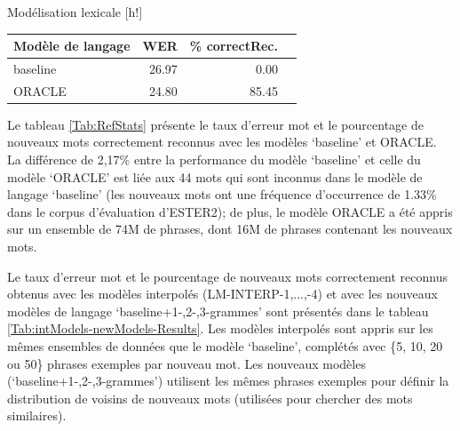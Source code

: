 \documentclass{style/these}
\makeatletter
\renewcommand\familydefault{ptm}
\renewenvironment{table}%
{ \renewcommand{\familydefault}{ptm}\selectfont
  \@float{table}}
  {\end@float}
\makeatother
\begin{document}
\begin{part}{Modélisation lexicale}
\begin{table}[h!]
\centering
\begin{tabular}{|l|r|r|r|}
\hline
{\bf Modèle de langage}	& {\bf WER}	& {\bf \% correctRec.} 	\\ \hline
baseline 				& 26.97		& 0.00			\\ \hline
ORACLE 					& 24.80		& 85.45			\\ \hline
\end{tabular}
\caption{Statistiques obtenues sur les modèles de langage de référence}
\label{Tab:RefStats}
\end{table}

Le tableau \ref{Tab:RefStats} présente le taux d'erreur mot et le pourcentage de nouveaux mots correctement reconnus avec les modèles `baseline' et ORACLE. 
La différence de 2,17\% entre la performance du modèle `baseline' et celle du modèle `ORACLE' est liée aux 44 mots qui sont inconnus dans le modèle de langage `baseline' (les nouveaux mots ont une fréquence d'occurrence de 1.33\% dans le corpus d'évaluation d'ESTER2); de plus, le modèle ORACLE a été appris sur un ensemble de 74M de phrases, dont 16M de phrases contenant les nouveaux mots. 

Le taux d'erreur mot et le pourcentage de nouveaux mots correctement reconnus obtenus avec les modèles interpolés (LM-INTERP-1,...,-4) et avec les nouveaux modèles de langage `baseline+1-,2-,3-grammes' sont présentés dans le tableau \ref{Tab:intModels-newModels-Results}. 
Les modèles interpolés sont appris sur les mêmes ensembles de données que le modèle `baseline', complétés avec \{5, 10, 20 ou 50\} phrases exemples par nouveau mot. 
Les nouveaux modèles (`baseline+1-,2-,3-grammes') utilisent les mêmes phrases exemples pour définir la distribution de voisins de nouveaux mots (utilisées pour chercher des mots similaires).


\end{part}
\end{document}
